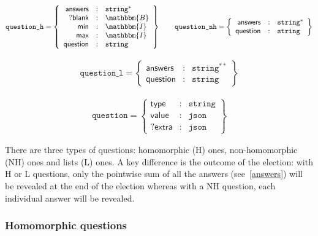 \documentclass[a4paper]{article}
\newcommand{\I}{\mathbbm{I}}
\newcommand{\B}{\mathbbm{B}}
\newcommand{\jstring}{\texttt{string}}
\begin{document}
\newcommand{\question}{\texttt{question}}

\newcommand{\blank}{\textsf{blank}}
\newcommand{\minlabel}{\textsf{min}}
\newcommand{\maxlabel}{\textsf{max}}
\newcommand{\answers}{\textsf{answers}}

\begin{gather*}
  \texttt{question\_h}=\left\{
    \begin{array}{rcl}
      \answers&:&\jstring^\ast\\
      ?\blank&:&\B\\
      \minlabel&:&\I\\
      \maxlabel&:&\I\\
      \textsf{question}&:&\jstring
    \end{array}
  \right\}
  \qquad
  \texttt{question\_nh}=\left\{
    \begin{array}{rcl}
      \answers&:&\jstring^\ast\\
      \textsf{question}&:&\jstring
    \end{array}
  \right\}
\end{gather*}

\begin{gather*}
  \texttt{question\_l}=\left\{
    \begin{array}{rcl}
      \answers&:&\jstring^{\ast\ast}\\
      \textsf{question}&:&\jstring
    \end{array}
  \right\}
\end{gather*}

\begin{gather*}
  \texttt{question}=\left\{
    \begin{array}{rcl}
      \textsf{type}&:&\jstring\\
      \textsf{value}&:&\texttt{json}\\
      ?\textsf{extra}&:&\texttt{json}
    \end{array}
  \right\}
\end{gather*}

There are three types of questions: homomorphic (H) ones,
non-homomorphic (NH) ones and lists (L) ones. A key difference is the
outcome of the election: with H or L questions, only the pointwise sum
of all the answers (see~\ref{answers}) will be revealed at the end of
the election whereas with a NH question, each individual answer will
be revealed.

\subsubsection{Homomorphic questions}
\end{document}
